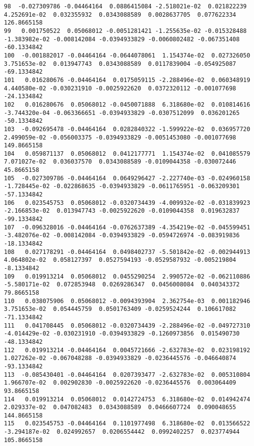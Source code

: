 \documentclass[15pt,a4paper,openright]{article}
\begin{document}
\begin{lstlisting}[language=AMPL, caption = data file]
98  -0.027309786 -0.04464164  0.0886415084 -2.518021e-02  0.021822239  4.252691e-02  0.032355932  0.0343088589  0.0028637705  0.077622334  126.8665158
99   0.001750522  0.05068012 -0.0051281421 -1.255635e-02 -0.015328488 -1.383982e-02 -0.008142084 -0.0394933829 -0.0060802482 -0.067351408  -60.1334842
100  -0.001882017 -0.04464164 -0.0644078061  1.154374e-02  0.027326050  3.751653e-02  0.013947743  0.0343088589  0.0117839004 -0.054925087  -69.1334842
101   0.016280676 -0.04464164  0.0175059115 -2.288496e-02  0.060348919  4.440580e-02 -0.030231910 -0.0025922620  0.0372320112 -0.001077698  -24.1334842
102   0.016280676  0.05068012 -0.0450071888  6.318680e-02  0.010814616 -3.744320e-04 -0.063366651 -0.0394933829 -0.0307512099  0.036201265  -50.1334842
103  -0.092695478 -0.04464164  0.0282840322 -1.599922e-02  0.036957720  2.499059e-02 -0.056003375 -0.0394933829 -0.0051453080 -0.001077698  149.8665158
104   0.059871137  0.05068012  0.0412177771  1.154374e-02  0.041085579  7.071027e-02  0.036037570  0.0343088589 -0.0109044358 -0.030072446   45.8665158
105  -0.027309786 -0.04464164  0.0649296427 -2.227740e-03 -0.024960158 -1.728445e-02 -0.022868635 -0.0394933829 -0.0611765951 -0.063209301  -57.1334842
106   0.023545753  0.05068012 -0.0320734439 -4.009932e-02 -0.031839923 -2.166853e-02  0.013947743 -0.0025922620 -0.0109044358  0.019632837  -99.1334842
107  -0.096328016 -0.04464164 -0.0762637389 -4.354219e-02 -0.045599451 -3.482076e-02 -0.008142084 -0.0394933829 -0.0594726974 -0.083919836  -18.1334842
108   0.027178291 -0.04464164  0.0498402737 -5.501842e-02 -0.002944913  4.064802e-02  0.058127397  0.0527594193 -0.0529587932 -0.005219804   -8.1334842
109   0.019913214  0.05068012  0.0455290254  2.990572e-02 -0.062110886 -5.580171e-02  0.072853948  0.0269286347  0.0456008084  0.040343372   79.8665158
110   0.038075906  0.05068012 -0.0094393904  2.362754e-03  0.001182946  3.751653e-02  0.054445759  0.0501763409 -0.0259524244  0.106617082  -71.1334842
111   0.041708445  0.05068012 -0.0320734439 -2.288496e-02 -0.049727310 -4.014429e-02 -0.030231910 -0.0394933829 -0.1260973856  0.015490730  -48.1334842
112   0.019913214 -0.04464164  0.0045721666 -2.632783e-02  0.023198192  1.027262e-02 -0.067048288 -0.0394933829 -0.0236445576 -0.046640874  -93.1334842
113  -0.085430401 -0.04464164  0.0207393477 -2.632783e-02  0.005310804  1.966707e-02  0.002902830 -0.0025922620 -0.0236445576  0.003064409   93.8665158
114   0.019913214  0.05068012  0.0142724753  6.318680e-02  0.014942474  2.029337e-02  0.047082483  0.0343088589  0.0466607724  0.090048655  144.8665158
115   0.023545753 -0.04464164  0.1101977498  6.318680e-02  0.013566522 -3.294187e-02  0.024992657  0.0206554442  0.0992402257  0.023774944  105.8665158

\end{lstlisting}
\end{document}
